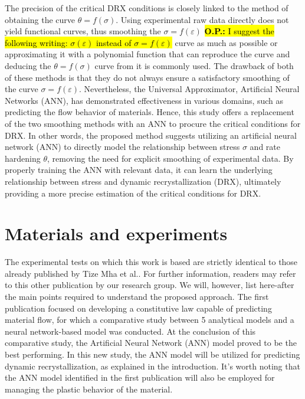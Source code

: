 \documentclass[metals,article,submit,pdftex,moreauthors]{Definitions/mdpi}
\makeatletter
\DeclareRobustCommand{\eal}{et al.\@\xspace}
\DeclareRobustCommand{\OP}[1]{\begingroup\sethlcolor{VWyellow}\textcolor{red}{\hl{\textbf{O.P.:} #1}}\endgroup}
\makeatother
\begin{document}
The precision of the critical DRX conditions is closely linked to the method of obtaining the curve $\theta=f(\sigma)$.
Using experimental raw data directly does not yield functional curves, thus smoothing the $\sigma=f(\varepsilon)$ \OP{I suggest the following writing: $\sigma(\varepsilon)$ instead of $\sigma=f(\varepsilon)$} curve as much as possible or approximating it with a polynomial function that can reproduce the curve and deducing the $\theta=f(\sigma)$ curve from it is commonly used.
The drawback of both of these methods is that they do not always ensure a satisfactory smoothing of the curve $\sigma=f(\varepsilon)$.
Nevertheless, the Universal Approximator, Artificial Neural Networks (ANN), has demonstrated effectiveness in various domains, such as predicting the flow behavior of materials.
Hence, this study offers a replacement of the two smoothing methods with an ANN to procure the critical conditions for DRX.
In other words, the proposed method suggests utilizing an artificial neural network (ANN) to directly model the relationship between stress $\sigma$ and rate hardening $\theta$, removing the need for explicit smoothing of experimental data.
By properly training the ANN with relevant data, it can learn the underlying relationship between stress and dynamic recrystallization (DRX), ultimately providing a more precise estimation of the critical conditions for DRX.

\section{Materials and experiments\label{sec:MaterialsExperiments}}

The experimental tests on which this work is based are strictly identical to those already published by Tize Mha \eal \cite{TizeMha-2023}.
For further information, readers may refer to this other publication by our research group.
We will, however, list here-after the main points required to understand the proposed approach.
The first publication focused on developing a constitutive law capable of predicting material flow, for which a comparative study between 5 analytical models and a neural network-based model was conducted.
At the conclusion of this comparative study, the Artificial Neural Network (ANN) model proved to be the best performing.
In this new study, the ANN model will be utilized for predicting dynamic recrystallization, as explained in the introduction.
It's worth noting that the ANN model identified in the first publication will also be employed for managing the plastic behavior of the material.
\end{document}
